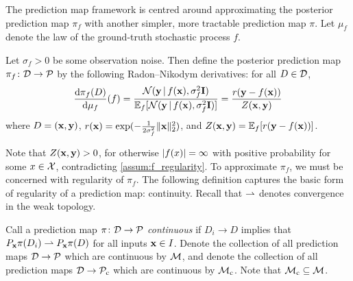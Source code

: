 \documentclass[12pt, twoside]{report}
\begin{document}
The prediction map framework is centred around approximating the posterior prediction map $\pi_f$ with another simpler, more tractable prediction map $\pi$.
Let $\mu_f$ denote the law of the ground-truth stochastic process $f$.

\begin{definition}
    \label{def:posterior_prediction_map_formal}
    Let $\sigma_f > 0$ be some observation noise.
    Then define the posterior prediction map $\pi_f\colon \D \to \Pc$
    by the following Radon--Nikodym derivatives:
    for all $D \in \D$,
    \begin{equation} \label{eq:density_posterior_prediction_map}
        \frac{\sd \pi_f(D)}{\sd \mu_f}(f)
        =
        \frac
            {\Normal(\vy \cond f(\vx), \sigma_f^2 \mI)}
            {\E_f[\Normal(\vy \cond f(\vx), \sigma_f^2 \mI)]}
        =
        \frac
            {r(\vy - f(\vx))}
            {Z(\vx, \vy)}
    \end{equation}
    where $D = (\vx, \vy)$,
    $r(\vx) = \exp({-\tfrac{1}{2\sigma_f^2}\norm{\vx}_2^2})$,
    and $Z(\vx, \vy) = \E_f[r(\vy - f(\vx))]$.
\end{definition}

Note that $Z(\vx, \vy) > 0$, for otherwise $\abs{f(x)} = \infty$ with positive probability for some $x \in \X$, contradicting \cref{assum:f_regularity}. %
To approximate $\pi_f$, we must be concerned with regularity of $\pi_f$.
The following definition captures the basic form of regularity of a prediction map: continuity.
Recall that $\weakto$ denotes convergence in the weak topology.

\begin{definition}
    \label{def:continuous_prediction_map}
    Call a prediction map $\pi\colon \D \to \Pc$ \emph{continuous} if
    $D_i \to D$
    implies that 
    $P_\vx \pi(D_i) \weakto P_\vx \pi(D)$ 
    for all inputs $\vx \in I$. 
    Denote the collection of all prediction maps $\D \to \Pc$ which are continuous by $\M$,
    and denote the collection of all prediction maps $\D \to \Pc\ss{c}$ which are continuous by $\M\ss{c}$.
    Note that $\M\ss{c} \sub \M$.
\end{definition}
\end{document}
